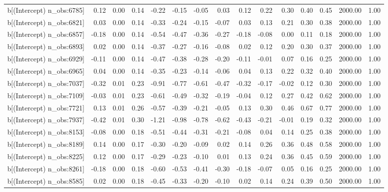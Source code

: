 \begin{table}[ht]
\begin{tabular}{rrrrrrrrrrrrrrr}
  b[(Intercept) n\_obs:6785] & 0.12 & 0.00 & 0.14 & -0.22 & -0.15 & -0.05 & 0.03 & 0.12 & 0.22 & 0.30 & 0.40 & 0.45 & 2000.00 & 1.00 \\ 
  b[(Intercept) n\_obs:6821] & 0.03 & 0.00 & 0.14 & -0.33 & -0.24 & -0.15 & -0.07 & 0.03 & 0.13 & 0.21 & 0.30 & 0.38 & 2000.00 & 1.00 \\ 
  b[(Intercept) n\_obs:6857] & -0.18 & 0.00 & 0.14 & -0.54 & -0.47 & -0.36 & -0.27 & -0.18 & -0.08 & 0.00 & 0.11 & 0.18 & 2000.00 & 1.00 \\ 
  b[(Intercept) n\_obs:6893] & 0.02 & 0.00 & 0.14 & -0.37 & -0.27 & -0.16 & -0.08 & 0.02 & 0.12 & 0.20 & 0.30 & 0.37 & 2000.00 & 1.00 \\ 
  b[(Intercept) n\_obs:6929] & -0.11 & 0.00 & 0.14 & -0.47 & -0.38 & -0.28 & -0.20 & -0.11 & -0.01 & 0.07 & 0.16 & 0.25 & 2000.00 & 1.00 \\ 
  b[(Intercept) n\_obs:6965] & 0.04 & 0.00 & 0.14 & -0.35 & -0.23 & -0.14 & -0.06 & 0.04 & 0.13 & 0.22 & 0.32 & 0.40 & 2000.00 & 1.00 \\ 
  b[(Intercept) n\_obs:7037] & -0.32 & 0.01 & 0.23 & -0.91 & -0.77 & -0.61 & -0.47 & -0.32 & -0.17 & -0.02 & 0.12 & 0.30 & 2000.00 & 1.00 \\ 
  b[(Intercept) n\_obs:7109] & -0.03 & 0.01 & 0.23 & -0.61 & -0.49 & -0.32 & -0.19 & -0.04 & 0.12 & 0.27 & 0.42 & 0.62 & 2000.00 & 1.00 \\ 
  b[(Intercept) n\_obs:7721] & 0.13 & 0.01 & 0.26 & -0.57 & -0.39 & -0.21 & -0.05 & 0.13 & 0.30 & 0.46 & 0.67 & 0.77 & 2000.00 & 1.00 \\ 
  b[(Intercept) n\_obs:7937] & -0.42 & 0.01 & 0.30 & -1.21 & -0.98 & -0.78 & -0.62 & -0.43 & -0.21 & -0.01 & 0.19 & 0.32 & 2000.00 & 1.00 \\ 
  b[(Intercept) n\_obs:8153] & -0.08 & 0.00 & 0.18 & -0.51 & -0.44 & -0.31 & -0.21 & -0.08 & 0.04 & 0.14 & 0.25 & 0.38 & 2000.00 & 1.00 \\ 
  b[(Intercept) n\_obs:8189] & 0.14 & 0.00 & 0.17 & -0.30 & -0.20 & -0.09 & 0.02 & 0.14 & 0.26 & 0.36 & 0.48 & 0.58 & 2000.00 & 1.00 \\ 
  b[(Intercept) n\_obs:8225] & 0.12 & 0.00 & 0.17 & -0.29 & -0.23 & -0.10 & 0.01 & 0.13 & 0.24 & 0.36 & 0.45 & 0.59 & 2000.00 & 1.00 \\ 
  b[(Intercept) n\_obs:8261] & -0.18 & 0.00 & 0.18 & -0.60 & -0.53 & -0.41 & -0.30 & -0.18 & -0.07 & 0.05 & 0.16 & 0.25 & 2000.00 & 1.00 \\ 
  b[(Intercept) n\_obs:8585] & 0.02 & 0.00 & 0.18 & -0.45 & -0.33 & -0.20 & -0.10 & 0.02 & 0.14 & 0.24 & 0.39 & 0.50 & 2000.00 & 1.00 \\ 

\end{tabular}
\end{table}
